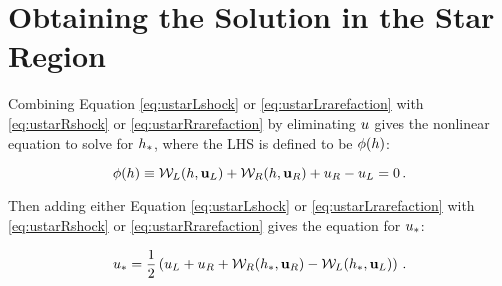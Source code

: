 \section{Obtaining the Solution in the Star Region}

Combining Equation \eqref{eq:ustarLshock} or \eqref{eq:ustarLrarefaction}
with \eqref{eq:ustarRshock} or \eqref{eq:ustarRrarefaction} by eliminating
$u$ gives the nonlinear
equation to solve for $h_*$, where the LHS is defined to be $\phi(h)$:

\begin{equation}
  \phi(h) \equiv
    \mathcal{W}_L(h,\mathbf{u}_L)
    + \mathcal{W}_R(h,\mathbf{u}_R)
    + u_R - u_L
    = 0 \,.
\end{equation}

Then adding either Equation \eqref{eq:ustarLshock} or \eqref{eq:ustarLrarefaction}
with \eqref{eq:ustarRshock} or \eqref{eq:ustarRrarefaction} gives the equation
for $u_*$:

\begin{equation}
  u_* = \frac{1}{2}\left(u_L + u_R
    + \mathcal{W}_R(h_*,\mathbf{u}_R)
    - \mathcal{W}_L(h_*,\mathbf{u}_L)\right)
    \,.
\end{equation}

\pagebreak{}
